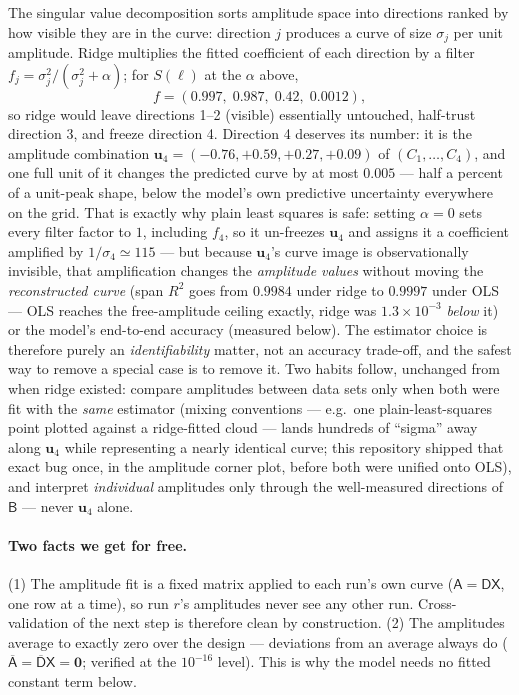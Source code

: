 The singular value decomposition sorts amplitude space into directions
ranked by how visible they are in the curve: direction $j$ produces a
curve of size $\sigma_j$ per unit amplitude. Ridge multiplies the fitted
coefficient of each direction by a filter
$f_j=\sigma_j^2/(\sigma_j^2+\alpha)$; for $S(\ell)$ at the $\alpha$ above,
\[
f=(0.997,\;0.987,\;0.42,\;0.0012),
\]
so ridge would leave directions 1--2 (visible) essentially untouched,
half-trust direction 3, and freeze direction 4. Direction 4 deserves its
number: it is the amplitude combination
$\mathbf{u}_4=(-0.76,+0.59,+0.27,+0.09)$ of $(C_1,\dots,C_4)$, and one
full unit of it changes the predicted curve by at most $0.005$ --- half a
percent of a unit-peak shape, below the model's own predictive
uncertainty everywhere on the grid. That is exactly why plain least
squares is safe: setting $\alpha=0$ sets every filter factor to $1$,
including $f_4$, so it un-freezes $\mathbf{u}_4$ and assigns it a
coefficient amplified by $1/\sigma_4\simeq115$ --- but because $\mathbf{u}_4$'s
curve image is observationally invisible, that amplification changes the
\emph{amplitude values} without moving the \emph{reconstructed curve}
(span $R^2$ goes from $0.9984$ under ridge to $0.9997$ under OLS ---
OLS reaches the free-amplitude ceiling exactly, ridge was $1.3\times10^{-3}$
\emph{below} it) or the model's end-to-end accuracy (measured below). The
estimator choice is therefore purely an \emph{identifiability} matter, not
an accuracy trade-off, and the safest way to remove a special case is to
remove it. Two habits follow, unchanged from when ridge existed: compare
amplitudes between data sets only when both were fit with the \emph{same}
estimator (mixing conventions --- e.g.\ one plain-least-squares point
plotted against a ridge-fitted cloud --- lands hundreds of ``sigma'' away
along $\mathbf{u}_4$ while representing a nearly identical curve; this
repository shipped that exact bug once, in the amplitude corner plot,
before both were unified onto OLS), and interpret \emph{individual}
amplitudes only through the well-measured directions of $\mathsf{B}$
--- never $\mathbf{u}_4$ alone.

\paragraph{Two facts we get for free.}
(1) The amplitude fit is a fixed matrix applied to each run's own curve
($\mathsf{A}=\mathsf{D}\mathsf{X}$, one row at a time), so run $r$'s
amplitudes never see any other run.  Cross-validation of the next step is
therefore clean by construction.  (2) The amplitudes average to exactly
zero over the design --- deviations from an average always do
($\overline{\mathsf{A}}=\overline{\mathsf{D}}\mathsf{X}=\mathbf{0}$;
verified at the $10^{-16}$ level).  This is why the model needs no fitted
constant term below.

